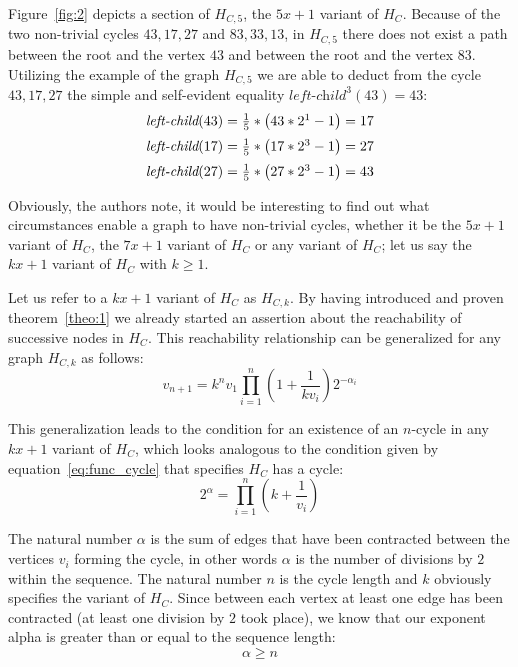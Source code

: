 \documentclass{SciPress_2015}
\begin{document}
Figure~\ref{fig:2} depicts a section of $H_{C,5}$, the $5x+1$ variant of $H_C$. Because of the two non-trivial cycles $43,17,27$ and $83,33,13$, in $H_{C,5}$ there does not exist a path between the root and the vertex $43$ and between the root and the vertex $83$. Utilizing the example of the graph $H_{C,5}$ we are able to deduct from the cycle $43,17,27$ the simple and self-evident equality $\textit{left-child}^3(43)=43$:
\begin{equation*}
\begin{array}{l}
\textit{left-child}(43)=\frac{1}{5}*\left(43*2^1-1\right)=17
\\[\medskipamount]
\textit{left-child}(17)=\frac{1}{5}*\left(17*2^3-1\right)=27
\\[\medskipamount]
\textit{left-child}(27)=\frac{1}{5}*\left(27*2^3-1\right)=43
\end{array}
\end{equation*}

Obviously, the authors note, it would be interesting to find out what circumstances enable a graph to have non-trivial cycles, whether it be the $5x+1$ variant of $H_C$, the $7x+1$ variant of $H_C$ or any variant of $H_C$; let us say the $kx+1$ variant of $H_C$ with $k\geq 1$.

Let us refer to a $kx+1$ variant of $H_C$ as $H_{C,k}$. By having introduced and proven theorem~\ref{theo:1} we already started an assertion about the reachability of successive nodes in $H_C$. This reachability relationship can be generalized for any graph $H_{C,k}$ as follows:
\begin{equation}
\label{eq:generalized_reachability}
v_{n+1}=k^nv_1\prod_{i=1}^{n}\left(1+\frac{1}{kv_{i}}\right)2^{-\alpha_i}
\end{equation}

This generalization leads to the condition for an existence of an $n$-cycle in any $kx+1$ variant of $H_C$, which looks analogous to the condition given by equation~\ref{eq:func_cycle} that specifies $H_C$ has a cycle:
\begin{equation}
\label{eq:generalized_cycle}
2^\alpha=\prod_{i=1}^{n}\left(k+\frac{1}{v_i}\right)
\end{equation}

The natural number $\alpha$ is the sum of edges that have been contracted between the vertices $v_i$ forming the cycle, in other words $\alpha$ is the number of divisions by $2$ within the sequence. The natural number $n$ is the cycle length and $k$ obviously specifies the variant of $H_C$. Since between each vertex at least one edge has been contracted (at least one division by $2$ took place), we know that our exponent alpha is greater than or equal to the sequence length:
\begin{equation}
\label{eq:n_alpha}
\alpha\ge n
\end{equation}
\end{document}
